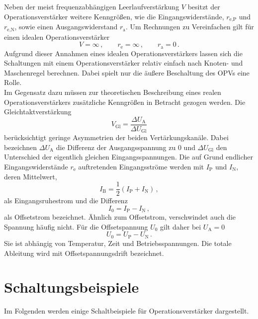 \documentclass[
  bibliography=totoc,     %
  captions=tableheading,  %
  titlepage=firstiscover, %
]{scrartcl}
\begin{document}
\noindent
Neben der meist frequenzabhängigen Leerlaufverstärkung $V$ besitzt der
Operationsverstärker weitere Kenngrößen, wie die Eingangswiderstände,
$r_\text{e,P}$ und $r_\text{e,N}$, sowie
einen Ausgangswiderstand $r_\text{a}$.
Um Rechnungen zu Vereinfachen gilt für einen idealen Operationsverstärker
\begin{equation}
\label{eq:id-verstärker}
    V = \infty\,,\qquad r_\text{e} = \infty\,,\qquad r_\text{a} = 0\,.
\end{equation}
Aufgrund dieser Annahmen eines idealen Operationsverstärkers lassen sich die
Schaltungen mit einem Operationsverstärker relativ einfach nach Knoten- und Maschenregel
berechnen. Dabei spielt nur die äußere Beschaltung des OPVs eine Rolle.\\

\noindent
Im Gegensatz dazu müssen zur theoretischen Beschreibung eines realen
Operationsverstärkers zusätzliche Kenngrößen in Betracht gezogen werden.
\noindent
Die Gleichtaktverstärkung
\begin{equation}
\label{eq:gleichtaktverstärkung}
    V_\text{Gl} = \frac{\Delta U_\text{A}}{\Delta U_\text{Gl}}
\end{equation}
berücksichtigt geringe Asymmetrien der beiden Vertärkungskanäle.
Dabei bezeichnen $\Delta U_\text{A}$ die Differenz der Ausgangsspannung zu
\num{0} und $\Delta U_\text{Gl}$ den Unterschied der eigentlich gleichen
Eingangsspannungen.
\noindent
Die auf Grund endlicher Eingangswiderstände $r_\text{e}$ auftretenden
Eingangsströme werden mit $I_\text{P}$ und $I_\text{N}$, deren
Mittelwert,
\begin{equation}
\label{eq:eingangsruhestrom}
    I_\text{B} = \frac{1}{2}\left(I_\text{P} + I_\text{N}\right)\,,
\end{equation}
als Eingangsruhestrom und die Differenz
\begin{equation}
\label{eq:offsetstrom}
    I_0 = I_\text{P} - I_\text{N}\,,
\end{equation}
als Offsetstrom bezeichnet.
Ähnlich zum Offsetstrom, verschwindet auch die Spannung häufig nicht.
Für die Offsetspannung $U_0$ gilt daher bei $U_\text{A} = 0$
\begin{equation}
\label{eq:offsetspannung}
    U_0 = U_\text{P} - U_\text{N}\,.
\end{equation}
Sie ist abhängig von Temperatur, Zeit und Betriebsspannungen. Die totale
Ableitung wird mit Offsetspannungsdrift bezeichnet.


\section{Schaltungsbeispiele}
\label{sec:schaltungsbeispiele}
Im Folgenden werden einige Schaltbeispiele für Operationsverstärker
dargestellt.
\end{document}
